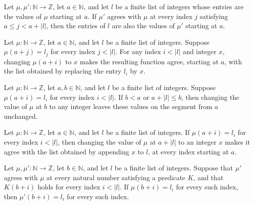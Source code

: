 \begin{theorem}
\label{Light.Seg.keep}
\leanok
{}
Let $\mu,\mu':\mathbb{N}\to\mathbb{Z}$, let $a\in\mathbb{N}$, and let $l$ be a finite
list of integers whose entries are the values of $\mu$ starting at $a$. If $\mu'$ agrees
with $\mu$ at every index $j$ satisfying $a\le j<a+|l|$, then the entries of $l$ are
also the values of $\mu'$ starting at $a$.
\end{theorem}

\begin{theorem}
\label{Light.Seg.update_in}
\leanok
{}
Let $\mu : \mathbb{N}\to\mathbb{Z}$, let $a\in\mathbb{N}$, and let $l$ be a finite list
of integers. Suppose $\mu(a+j)=l_j$ for every index $j<|l|$. For any index $i<|l|$ and
integer $x$, changing $\mu(a+i)$ to $x$ makes the resulting function agree, starting at
$a$, with the list obtained by replacing the entry $l_i$ by $x$.
\end{theorem}

\begin{theorem}
\label{Light.Seg.update_out}
\leanok
{}
Let $\mu : \mathbb{N}\to\mathbb{Z}$, let $a,b\in\mathbb{N}$, and let $l$ be a finite
list of integers. Suppose $\mu(a+i)=l_i$ for every index $i<|l|$. If $b<a$ or $a+|l|\le
b$, then changing the value of $\mu$ at $b$ to any integer leaves these values on the
segment from $a$ unchanged.
\end{theorem}

\begin{theorem}
\label{Light.Seg.snoc}
\leanok
{}
Let $\mu : \mathbb{N}\to\mathbb{Z}$, let $a\in\mathbb{N}$, and let $l$ be a finite list
of integers. If $\mu(a+i)=l_i$ for every index $i<|l|$, then changing the value of $\mu$
at $a+|l|$ to an integer $x$ makes it agree with the list obtained by appending $x$ to
$l$, at every index starting at $a$.
\end{theorem}

\begin{theorem}
\label{Light.Seg.of_sameOn}
\leanok
{}
Let $\mu,\mu' : \mathbb{N}\to\mathbb{Z}$, let $b\in\mathbb{N}$, and let $l$ be a finite
list of integers. Suppose that $\mu'$ agrees with $\mu$ at every natural number
satisfying a predicate $K$, and that $K(b+i)$ holds for every index $i<|l|$. If
$\mu(b+i)=l_i$ for every such index, then $\mu'(b+i)=l_i$ for every such index.
\end{theorem}

